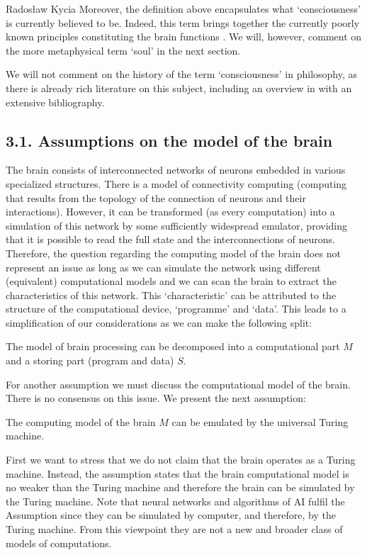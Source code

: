 \begin{artengenv}{Radosław Kycia}
Moreover, the definition above encapsulates what `consciousness' is currently believed to be. Indeed, this term brings together the currently poorly known principles constituting the brain functions \parencite[see, e.g.][]{Transhumanizm}. We will, however, comment on the more metaphysical term `soul' in the next section.

We will not comment on the history of the term `consciousness' in philosophy, as there is already rich literature on this subject, including an overview in  \parencite{StanfordEncyclopedyOfPhilosophy_Conciousness} with an extensive bibliography.



\subsection{3.1. Assumptions on the model of the brain}

The brain consists of interconnected networks of neurons embedded in various specialized structures. There is a model of connectivity computing \parencite{ModellingNeurons} (computing that results from the topology of the connection of neurons and their interactions). However, it can be transformed (as every computation) into a simulation of this network by some sufficiently widespread emulator, providing that it is possible to read the full state and the interconnections of neurons. Therefore, the question regarding the computing model of the brain does not represent an issue as long as we can simulate the network using different (equivalent) computational models and we can scan the brain to extract the characteristics of this network. This `characteristic' can be attributed to the structure of the computational device, `programme' and `data'. This leads to a simplification of our considerations as we can make the following split:
\begin{Assumption}
\label{Assumption_decomposition}
 The model of brain processing can be decomposed into a computational part $M$ and a storing part (program and data) $S$. 
\end{Assumption}
For another assumption we must discuss the computational model of the brain. There is no consensus on this issue. We present the next assumption:
\begin{Assumption}
\label{Assumption_computing}
 The computing model of the brain $M$ can be emulated by the universal Turing machine.
\end{Assumption}
First we want to stress that we do not claim that the brain operates as a Turing machine. Instead, the assumption states that the brain computational model is no weaker than the Turing machine and therefore the brain can be simulated by the Turing machine. Note that neural networks and algorithms of AI fulfil the Assumption since they can be simulated by computer, and therefore, by the Turing machine. From this viewpoint they are not a new and broader class of models of computations.



\end{artengenv}
